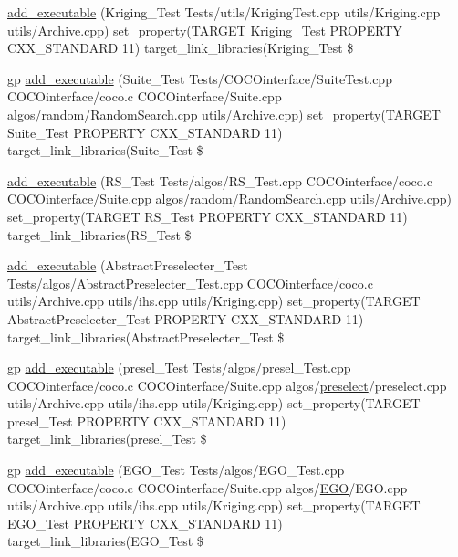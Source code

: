 \begin{DoxyCompactItemize}
\item 
\hyperlink{CMakeLists_8txt_a9b96cedf4718efb85586def1643f7f98}{add\+\_\+executable} (Kriging\+\_\+\+Test Tests/utils/Kriging\+Test.\+cpp utils/Kriging.\+cpp utils/Archive.\+cpp) set\+\_\+property(T\+A\+R\+G\+ET Kriging\+\_\+\+Test P\+R\+O\+P\+E\+R\+TY C\+X\+X\+\_\+\+S\+T\+A\+N\+D\+A\+RD 11) target\+\_\+link\+\_\+libraries(Kriging\+\_\+\+Test \$
\item 
gp \hyperlink{CMakeLists_8txt_a44ce61a7135df78bfa68b806faf791c7}{add\+\_\+executable} (Suite\+\_\+\+Test Tests/C\+O\+C\+Ointerface/Suite\+Test.\+cpp C\+O\+C\+Ointerface/coco.\+c C\+O\+C\+Ointerface/Suite.\+cpp algos/random/Random\+Search.\+cpp utils/Archive.\+cpp) set\+\_\+property(T\+A\+R\+G\+ET Suite\+\_\+\+Test P\+R\+O\+P\+E\+R\+TY C\+X\+X\+\_\+\+S\+T\+A\+N\+D\+A\+RD 11) target\+\_\+link\+\_\+libraries(Suite\+\_\+\+Test \$
\item 
\hyperlink{CMakeLists_8txt_aa1640549aca430478407243ffc608ff4}{add\+\_\+executable} (R\+S\+\_\+\+Test Tests/algos/R\+S\+\_\+\+Test.\+cpp C\+O\+C\+Ointerface/coco.\+c C\+O\+C\+Ointerface/Suite.\+cpp algos/random/Random\+Search.\+cpp utils/Archive.\+cpp) set\+\_\+property(T\+A\+R\+G\+ET R\+S\+\_\+\+Test P\+R\+O\+P\+E\+R\+TY C\+X\+X\+\_\+\+S\+T\+A\+N\+D\+A\+RD 11) target\+\_\+link\+\_\+libraries(R\+S\+\_\+\+Test \$
\item 
\hyperlink{CMakeLists_8txt_a188a5b789c038deb7e596849ea6222e1}{add\+\_\+executable} (Abstract\+Preselecter\+\_\+\+Test Tests/algos/Abstract\+Preselecter\+\_\+\+Test.\+cpp C\+O\+C\+Ointerface/coco.\+c utils/Archive.\+cpp utils/ihs.\+cpp utils/Kriging.\+cpp) set\+\_\+property(T\+A\+R\+G\+ET Abstract\+Preselecter\+\_\+\+Test P\+R\+O\+P\+E\+R\+TY C\+X\+X\+\_\+\+S\+T\+A\+N\+D\+A\+RD 11) target\+\_\+link\+\_\+libraries(Abstract\+Preselecter\+\_\+\+Test \$
\item 
gp \hyperlink{CMakeLists_8txt_a545b767753a42914a359da4e779d0f59}{add\+\_\+executable} (presel\+\_\+\+Test Tests/algos/presel\+\_\+\+Test.\+cpp C\+O\+C\+Ointerface/coco.\+c C\+O\+C\+Ointerface/Suite.\+cpp algos/\hyperlink{classpreselect}{preselect}/preselect.\+cpp utils/Archive.\+cpp utils/ihs.\+cpp utils/Kriging.\+cpp) set\+\_\+property(T\+A\+R\+G\+ET presel\+\_\+\+Test P\+R\+O\+P\+E\+R\+TY C\+X\+X\+\_\+\+S\+T\+A\+N\+D\+A\+RD 11) target\+\_\+link\+\_\+libraries(presel\+\_\+\+Test \$
\item 
gp \hyperlink{CMakeLists_8txt_a3b646844d2632d221e935cd395b8954c}{add\+\_\+executable} (E\+G\+O\+\_\+\+Test Tests/algos/E\+G\+O\+\_\+\+Test.\+cpp C\+O\+C\+Ointerface/coco.\+c C\+O\+C\+Ointerface/Suite.\+cpp algos/\hyperlink{classEGO}{E\+GO}/E\+G\+O.\+cpp utils/Archive.\+cpp utils/ihs.\+cpp utils/Kriging.\+cpp) set\+\_\+property(T\+A\+R\+G\+ET E\+G\+O\+\_\+\+Test P\+R\+O\+P\+E\+R\+TY C\+X\+X\+\_\+\+S\+T\+A\+N\+D\+A\+RD 11) target\+\_\+link\+\_\+libraries(E\+G\+O\+\_\+\+Test \$

\end{DoxyCompactItemize}
